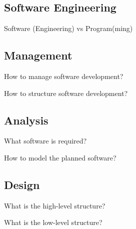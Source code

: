 \subsection{Software Engineering}
\begin{frame}{Software (Engineering) vs Program(ming)}
	\slideSEvsProgramming
\end{frame}

\subsection{Management}
\begin{frame}[2]{How to manage software development?}
	\slideGanttAndNetwork
\end{frame}
\begin{frame}[10]{How to structure software development?}
	\begin{fancycolumns}[widths={45}]
		\diagramWaterfallModel
	\nextcolumn
		\diagramVModel
	\end{fancycolumns}
\end{frame}

\subsection{Analysis}
\begin{frame}[1]{What software is required?}
	\slideMindmapNonFunctionalRequirements
\end{frame}
\begin{frame}{How to model the planned software?}
	\centering\slideMindmapUMLdiagrams{}{}{}{}{}{}{}{}{}
\end{frame}

\subsection{Design}
\begin{frame}{What is the high-level structure?}
	\begin{fancycolumns}[animation=none]
	\nextcolumn
	\end{fancycolumns}
\end{frame}
\begin{frame}{What is the low-level structure?}
	\begin{fancycolumns}[animation=none]
	\nextcolumn
	\end{fancycolumns}
\end{frame}

